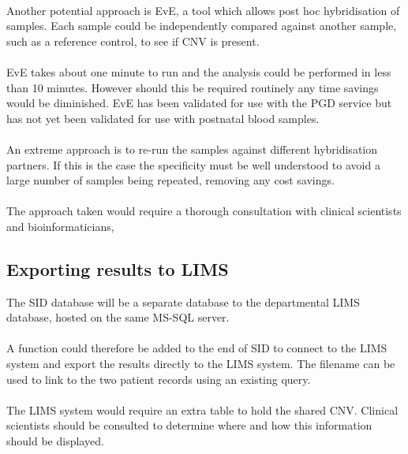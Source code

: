 \paragraph*{}
Another potential approach is EvE, a tool which allows post hoc hybridisation of samples. Each sample could be independently compared against another sample, such as a reference control, to see if CNV is present. 
\paragraph*{}
EvE takes about one minute to run and the analysis could be performed in less than 10 minutes. However should this be required routinely any time savings would be diminished.
EvE has been validated for use with the PGD service but has not yet been validated for use with postnatal blood samples.
\paragraph*{}
An extreme approach is to re-run the samples against different hybridisation partners. If this is the case the specificity must be well understood to avoid a large number of samples being repeated, removing any cost savings.
\paragraph*{}
The approach taken would require a thorough consultation with clinical scientists and bioinformaticians,

\subsection{Exporting results to LIMS}
The SID database will be a separate database to the departmental LIMS database, hosted on the same MS-SQL server.
\paragraph*{}
A function could therefore be added to the end of SID to connect to the LIMS system and export the results directly to the LIMS system. The filename can be used to link to the two patient records using an existing query.
\paragraph*{}
The LIMS system would require an extra table to hold the shared CNV. Clinical scientists should be consulted to determine where and how this information should be displayed.
